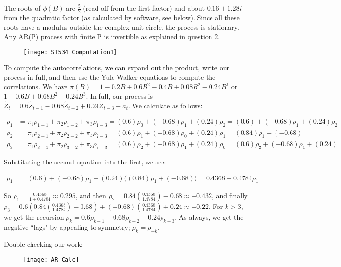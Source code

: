 \documentclass[12pt, letterpaper]{article}
\theoremstyle{definition}
\numberwithin{equation}{section}
\newcommand{\+}[1]{+_{\scalebox{.375}{#1}}}
\newcommand{\1}{\mathbbm{1}}
\begin{document}
The roots of $\phi(B)$ are $\frac{5}{2}$ (read off from the first factor) and about $0.16\pm 1.28i$ from the quadratic factor (as calculated by software, see below). Since all these roots have a modulus outside the complex unit circle, the process is stationary. Any AR(P) process  with finite P is invertible as explained in question 2.

\begin{figure}[H]
	\centering
	\texttt{[image: ST534 Computation1]}
\end{figure}

To compute the autocorrelations, we can expand out the product, write our process in full, and then use the Yule-Walker equations to compute the correlations. We have $\pi(B)=1-0.2B+0.6B^2-0.4B+0.08B^2-0.24B^3$ or $1-0.6B+0.68B^2-0.24B^3$. In full, our process is $\tilde{Z}_t=0.6\tilde{Z}_{t-1}-0.68\tilde{Z}_{t-2}+0.24\tilde{Z}_{t-3}+a_t$. We calculate as follows:

\vspace{-0.5cm}
\begin{align*}
	\rho_1&=\pi_1\rho_{1-1}+\pi_2\rho_{1-2}+\pi_{3}\rho_{1-3}=(0.6)\rho_0+(-0.68)\rho_1+(0.24)\rho_2=(0.6)+(-0.68)\rho_1+(0.24)\rho_2\\
	\rho_2&=\pi_1\rho_{2-1}+\pi_2\rho_{2-2}+\pi_{3}\rho_{2-3}=(0.6)\rho_1+(-0.68)\rho_0+(0.24)\rho_1=(0.84)\rho_1+(-0.68)\\
	\rho_3&=\pi_1\rho_{3-1}+\pi_2\rho_{3-2}+\pi_{3}\rho_{3-3}=(0.6)\rho_2+(-0.68)\rho_1+(0.24)\rho_0=(0.6)\rho_2+(-0.68)\rho_1+(0.24)
\end{align*}

Substituting the second equation into the first, we see:

\vspace{-0.5cm}
\begin{align*}
	\rho_1&=(0.6)+(-0.68)\rho_1+(0.24)\big((0.84)\rho_1+(-0.68)\big)=0.4368-0.4784\rho_1
\end{align*}

So $\rho_1=\frac{0.4368}{1+0.4784} \approx 0.295$, and then $\rho_2=0.84(\frac{0.4368}{1.4784})-0.68\approx -0.432$, and finally $\rho_3=0.6(0.84(\frac{0.4368}{1.4784})-0.68)+(-0.68)(\frac{0.4368}{1.4784})+0.24 \approx -0.22$. For $k>3$, we get the recursion $\rho_k=0.6\rho_{k-1}-0.68\rho_{k-2}+0.24\rho_{k-3}$. As always, we get the negative ``lags" by appealing to symmetry; $\rho_k=\rho_{-k}$.
\vspace{\baselineskip}

Double checking our work:

\begin{figure}[H]
	\centering
	\texttt{[image: AR Calc]}
\end{figure} 
\end{document}

